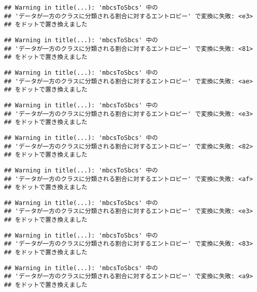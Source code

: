 \documentclass[
]{article}
\begin{document}
\begin{verbatim}
## Warning in title(...): 'mbcsToSbcs' 中の
## 'データが一方のクラスに分類される割合に対するエントロピー' で変換に失敗: <e3>
## をドットで置き換えました
\end{verbatim}

\begin{verbatim}
## Warning in title(...): 'mbcsToSbcs' 中の
## 'データが一方のクラスに分類される割合に対するエントロピー' で変換に失敗: <81>
## をドットで置き換えました
\end{verbatim}

\begin{verbatim}
## Warning in title(...): 'mbcsToSbcs' 中の
## 'データが一方のクラスに分類される割合に対するエントロピー' で変換に失敗: <ae>
## をドットで置き換えました
\end{verbatim}

\begin{verbatim}
## Warning in title(...): 'mbcsToSbcs' 中の
## 'データが一方のクラスに分類される割合に対するエントロピー' で変換に失敗: <e3>
## をドットで置き換えました
\end{verbatim}

\begin{verbatim}
## Warning in title(...): 'mbcsToSbcs' 中の
## 'データが一方のクラスに分類される割合に対するエントロピー' で変換に失敗: <82>
## をドットで置き換えました
\end{verbatim}

\begin{verbatim}
## Warning in title(...): 'mbcsToSbcs' 中の
## 'データが一方のクラスに分類される割合に対するエントロピー' で変換に失敗: <af>
## をドットで置き換えました
\end{verbatim}

\begin{verbatim}
## Warning in title(...): 'mbcsToSbcs' 中の
## 'データが一方のクラスに分類される割合に対するエントロピー' で変換に失敗: <e3>
## をドットで置き換えました
\end{verbatim}

\begin{verbatim}
## Warning in title(...): 'mbcsToSbcs' 中の
## 'データが一方のクラスに分類される割合に対するエントロピー' で変換に失敗: <83>
## をドットで置き換えました
\end{verbatim}

\begin{verbatim}
## Warning in title(...): 'mbcsToSbcs' 中の
## 'データが一方のクラスに分類される割合に対するエントロピー' で変換に失敗: <a9>
## をドットで置き換えました
\end{verbatim}
\end{document}
